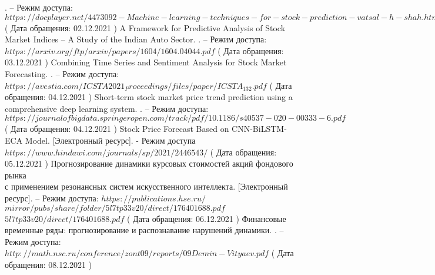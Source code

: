 \begin{thebibliography}{}
    . – Режим доступа: \\
    \newblock $https://docplayer.net/4473092-Machine-learning-techniques-for-stock-prediction-vatsal-h-shah.html$ ( Дата обращения: 02.12.2021 )
    \newblock A Framework for Predictive Analysis of Stock Market Indices – A Study of the Indian Auto Sector.
    . – Режим доступа: \\
    \newblock $https://arxiv.org/ftp/arxiv/papers/1604/1604.04044.pdf$ ( Дата обращения: 03.12.2021 )
    \newblock Combining Time Series and Sentiment Analysis for Stock Market Forecasting.
    . – Режим доступа: \\
    \newblock $https://avestia.com/ICSTA2021_Proceedings/files/paper/ICSTA_132.pdf$ ( Дата обращения: 04.12.2021 )
    \newblock Short-term stock market price trend prediction using a comprehensive deep learning system.
    . – Режим доступа: \\
    \newblock $https://journalofbigdata.springeropen.com/track/pdf/10.1186/s40537-020-00333-6.pdf$ ( Дата обращения: 04.12.2021 )
    \newblock Stock Price Forecast Based on CNN-BiLSTM-ECA Model. [Электронный ресурс]. - Режим доступа \\
    \newblock $https://www.hindawi.com/journals/sp/2021/2446543/$ ( Дата обращения: 05.12.2021 )
    \newblock Прогнозирование динамики курсовых стоимостей акций фондового рынка \\
    \newblock с применением резонансных систем искусственного интеллекта. [Электронный ресурс]. –  \newblock Режим доступа: $https://publications.hse.ru/$ $mirror/pubs/share/folder/5l7tp33v20/direct/176401688.pdf$
    \newblock $5l7tp33v20/direct/176401688.pdf$ ( Дата обращения: 06.12.2021 )
    \newblock Финансовые временные ряды: прогнозирование и распознавание нарушений динамики.
    . – Режим доступа: 
    \newblock $http://math.nsc.ru/conference/zont09/reports/09Demin-Vityaev.pdf$ ( Дата обращения: 08.12.2021 )


\end{thebibliography}
